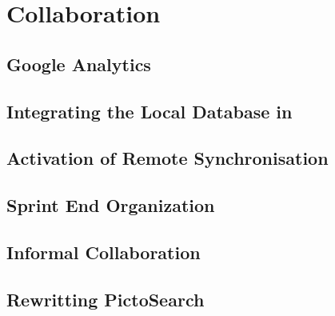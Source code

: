\chapter{Collaboration}\label{chap:collaboration}


\section{Google Analytics}


\section{Integrating the Local Database in \launcher}\label{sec:collab:localdbtolauncher}


\section{Activation of Remote Synchronisation}\label{sec:collab:remotedb}


\section{Sprint End Organization}\label{sec:collab:sprintend}


\section{Informal Collaboration}\label{sec:collab:adhoc}


\section{Rewritting PictoSearch}\label{sec:collab:pictosearch}

